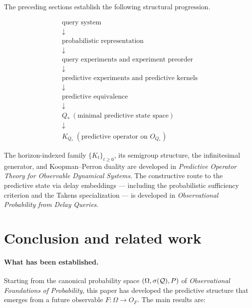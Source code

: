 The preceding sections establish the following structural progression.

\[
\begin{aligned}
&\text{query system}\\
&\downarrow\\
&\text{probabilistic representation}\\
&\downarrow\\
&\text{query experiments and experiment preorder}\\
&\downarrow\\
&\text{predictive experiments and predictive kernels}\\
&\downarrow\\
&\text{predictive equivalence}\\
&\downarrow\\
&Q_*\ (\text{minimal predictive state space})\\
&\downarrow\\
&K_{Q_*}\ (\text{predictive operator on }O_{Q_*})
\end{aligned}
\]

\begin{remark}[Continuation]
The horizon-indexed family $\{K_t\}_{t\ge0}$, its semigroup structure,
the infinitesimal generator, and Koopman--Perron duality are developed
in \emph{Predictive Operator Theory for Observable Dynamical Systems}.
The constructive route to the predictive state via delay embeddings ---
including the probabilistic sufficiency criterion and the Takens
specialization --- is developed in \emph{Observational Probability from
Delay Queries}.
\end{remark}

\section{Conclusion and related work}

\paragraph{What has been established.}
Starting from the canonical probability space $(\Omega,\sigma(\mathcal{Q}),P)$
of \emph{Observational Foundations of Probability}, this paper has
developed the predictive structure that emerges from a future observable
$F:\Omega\to O_F$.  The main results are:

